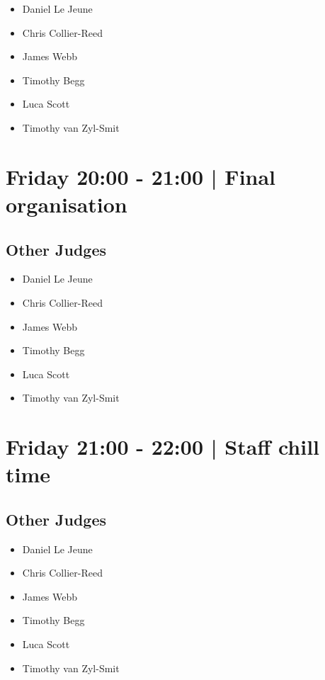 \documentclass[10pt]{article}
\begin{document}
            \begin{itemize}
                            \item Daniel Le Jeune
                            \item Chris Collier-Reed
                            \item James Webb
                            \item Timothy Begg
                            \item Luca Scott
                            \item Timothy van Zyl-Smit
                        \end{itemize}
        

            \section*{Friday 20:00
        -
        21:00
        |
         Final organisation}
        
                
        \subsection*{Other Judges}
        
            \begin{itemize}
                            \item Daniel Le Jeune
                            \item Chris Collier-Reed
                            \item James Webb
                            \item Timothy Begg
                            \item Luca Scott
                            \item Timothy van Zyl-Smit
                        \end{itemize}
        

            \section*{Friday 21:00
        -
        22:00
        |
         Staff chill time}
        
                
        \subsection*{Other Judges}
        
            \begin{itemize}
                            \item Daniel Le Jeune
                            \item Chris Collier-Reed
                            \item James Webb
                            \item Timothy Begg
                            \item Luca Scott
                            \item Timothy van Zyl-Smit
                        \end{itemize}
        
\end{document}

